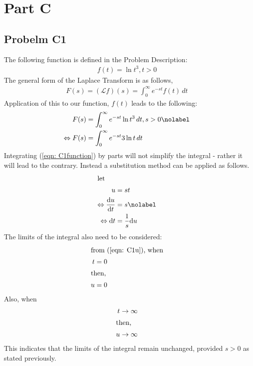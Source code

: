 \documentclass[a4paper,10pt,reqno]{amsart}
\numberwithin{equation}{section}
\begin{document}
\section{Part C}

\subsection{Probelm C1}\label{sec:c1}
The following function is defined in the Problem Description:
\begin{align}
f(t) = \ln t^3, t>0 \label{eqn: C1function}
\end{align}
The general form of the Laplace Transform is as follows,
\begin{align}
F(s) = (\mathscr{L}f)(s) =  \int_{0}^{\infty} e^{-st}f(t) \,dt  \label{eqn: Laplace}
\end{align}
Application of this to our function, $f(t)$ leads to the following:
\begin{align}
F(s) &= \int_{0}^{\infty} e^{-st} \ln t^3 \,dt, s>0  \nolabel \\
\Leftrightarrow F(s) &= \int_{0}^{\infty} e^{-st} 3\ln t \,dt  \label{eqn: C1beginning}
\end{align}
Integrating (\ref{eqn: C1function}) by parts will not simplify the integral - rather it will lead to the contrary. Instead a substitution method can be applied as follows.
\begin{align}
\intertext{let}
u &=st \label{eqn: C1u} \\
\Leftrightarrow \frac{\mathrm{d}u}{\mathrm{d}t} &= s \nolabel \\
\Leftrightarrow \mathrm{d}t &= \frac{1}{s} \mathrm{d}u \label{eqn: c1dt}
\end{align}
The limits of the integral also need to be considered:
\begin{align*}
\intertext{from (\ref{eqn: C1u}), when}
t &= 0 \\
\intertext{then,}
u &= 0 
\end{align*}
Also, when
\begin{align*}
t \rightarrow \infty \\
\intertext{then,}
u \rightarrow \infty \\
\end{align*}
This indicates that the limits of the integral remain unchanged, provided $s>0$ as stated previously.
\end{document}
